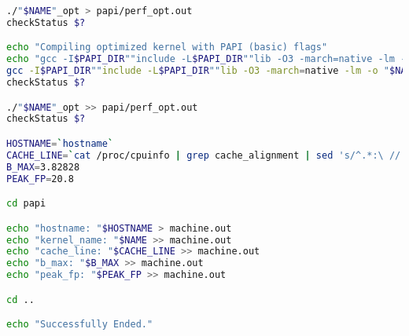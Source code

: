 \begin{lstlisting}[language=bash,breaklines=true]
./"$NAME"_opt > papi/perf_opt.out
checkStatus $?

echo "Compiling optimized kernel with PAPI (basic) flags"
echo "gcc -I$PAPI_DIR""include -L$PAPI_DIR""lib -O3 -march=native -lm -o "$NAME"_opt $FILENAME -lpapi -D PERFCOUNT"
gcc -I$PAPI_DIR""include -L$PAPI_DIR""lib -O3 -march=native -lm -o "$NAME"_opt $FILENAME -lpapi -D PERFCOUNT
checkStatus $?

./"$NAME"_opt >> papi/perf_opt.out
checkStatus $?

HOSTNAME=`hostname`
CACHE_LINE=`cat /proc/cpuinfo | grep cache_alignment | sed 's/^.*:\ //' | sort -u`
B_MAX=3.82828
PEAK_FP=20.8

cd papi

echo "hostname: "$HOSTNAME > machine.out
echo "kernel_name: "$NAME >> machine.out
echo "cache_line: "$CACHE_LINE >> machine.out
echo "b_max: "$B_MAX >> machine.out
echo "peak_fp: "$PEAK_FP >> machine.out

cd ..

echo "Successfully Ended."


\end{lstlisting}

